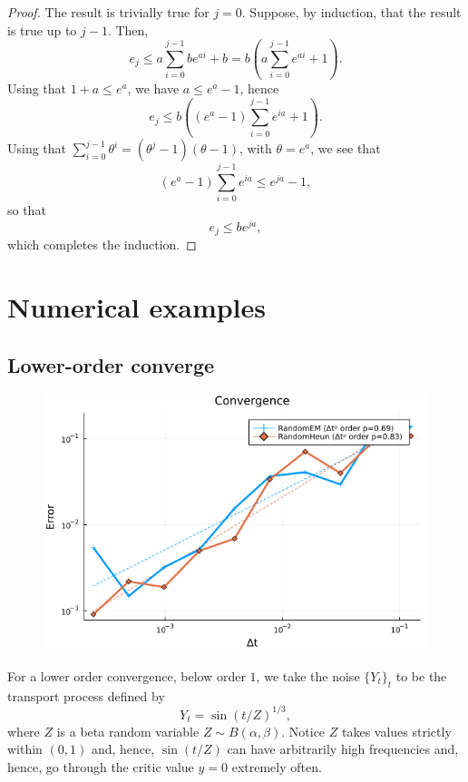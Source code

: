 \documentclass[reqno,12pt]{amsart}
\theoremstyle{plain}%
\theoremstyle{definition}
\begin{document}
\begin{proof}
  The result is trivially true for $j=0$. Suppose, by induction, that the result is true up to $j-1$. Then,
  $$
  e_j \leq a \sum_{i=0}^{j-1} be^{ai} + b = b \left(a \sum_{i=0}^{j-1} e^{ai} + 1\right).
  $$
  Using that $1 + a \leq e^a$, we have $a \leq e^a - 1$, hence
  $$
  e_j \leq b\left((e^a - 1)\sum_{i=0}^{j-1} e^{ia} + 1\right).
  $$
  Using that $\sum_{i=0}^{j-1} \theta^i = (\theta^j - 1)(\theta - 1)$, with $\theta = e^a$, we see that
  $$
  (e^a - 1)\sum_{i=0}^{j-1} e^{ia} \leq e^{ja} - 1,
  $$
  so that
  $$
  e_j \leq be^{ja},
  $$
  which completes the induction.
\end{proof}

\section{Numerical examples}

\subsection{Lower-order converge}

\begin{figure}
  \includegraphics[scale=0.8]{img/plot_13.png}
\end{figure}

For a lower order convergence, below order $1$, we take the noise $\{Y_t\}_t$ to be the transport process defined by
$$
Y_t = \sin(t/Z)^{1/3},
$$
where $Z$ is a beta random variable $Z \sim B(\alpha, \beta)$. Notice $Z$ takes values strictly within $(0, 1)$ and, hence, $\sin(t/Z)$ can have arbitrarily high frequencies and, hence, go through the critic value $y = 0$ extremely often.
\end{document}
